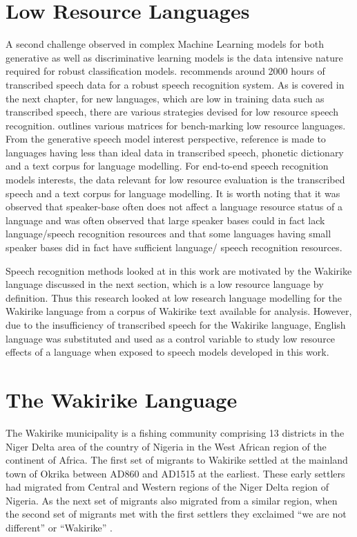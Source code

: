 \section{Low Resource Languages}
A second challenge observed in complex Machine Learning models for both generative as well as discriminative learning models is the data intensive nature required for robust classification models. \cite{saon2015ibm} recommends around 2000 hours of transcribed speech data for a robust speech recognition system. As is covered in the next chapter, for new languages, which are low in training data such as transcribed speech, there are various strategies devised for low resource speech recognition. \cite{besacier2014automatic} outlines various matrices for bench-marking low resource languages.  From the generative speech model interest perspective,  reference is made to languages having less than ideal data in transcribed speech, phonetic dictionary and a text corpus for language modelling.  For end-to-end speech recognition models interests, the data relevant for low resource evaluation is the transcribed speech and a text corpus for language modelling.  It is worth noting that it was observed \citep{besacier2014automatic} that speaker-base often does not affect a language resource status of a language and was often observed that large speaker bases could in fact lack language/speech recognition resources and that some languages having small speaker bases did in fact have sufficient language/ speech recognition resources.

Speech recognition methods looked at in this work are motivated by the Wakirike language discussed in the next section, which is a low resource language by definition.  Thus this research looked at low research language modelling for the Wakirike language from a corpus of Wakirike text available for analysis.  However, due to the insufficiency of transcribed speech for the Wakirike language, English language was substituted and used as a control variable to study low resource effects of a language when exposed to speech models developed in this work.

\section{The Wakirike Language}
The Wakirike municipality is a fishing community comprising 13 districts in the Niger Delta area of the country of Nigeria in the West African region of the continent of Africa. The first set of migrants to Wakirike settled at the mainland town of Okrika between AD860 and AD1515 at the earliest.  These early settlers had migrated from Central and Western regions of the Niger Delta region of Nigeria.  As the next set of migrants also migrated from a similar region, when the second set of migrants met with the first settlers they exclaimed “we are not different” or “Wakirike” \citep{wakirike}.  

